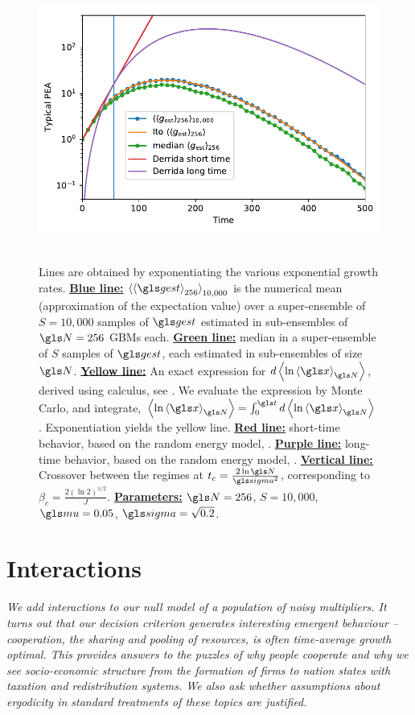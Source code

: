 \begin{figure}
\centering
\includegraphics[height=9.3cm]{./chapter_3/figs/PEA.pdf}
\caption{Lines are obtained by exponentiating the various exponential 
growth rates. {\bf \underline{Blue line:}} $\ave{\ave{\gest}_{256}}_{10,000}$ is the numerical mean 
(approximation of the expectation value) 
over a super-ensemble of $S=10,000$ samples of $\gest$ estimated in sub-ensembles of $\N=256$ GBMs each. 
{\bf \underline{Green line:}} median in a super-ensemble of $S$ samples of $\gest$, each estimated in sub-ensembles of size $\N$. 
{\bf \underline{Yellow line:}} An exact expression for $d\ave{\ln\ave{\x}_\N}$, derived using \Ito calculus, see \cite{PetersAdamou2018b}. We evaluate the expression by Monte Carlo, and integrate, $\ave{\ln\ave{\x}_\N}=\int_{0}^{\t} d\ave{\ln\ave{\x}_\N}$. Exponentiation yields the yellow line. 
{\bf \underline{Red line:}} short-time behavior, based on the random energy model, .
{\bf \underline{Purple line:}} long-time behavior, based on the random energy model, . {\bf \underline{Vertical line:}} Crossover between the regimes at $t_c=\frac{2\ln \N}{\gsigma^2}$, corresponding to $\beta_c=\frac{2(\ln 2)^{1/2}}{J}$.
{\bf \underline{Parameters:}} $\N=256$, $S=10,000$, $\gmu=0.05$, $\gsigma=\sqrt{0.2}$.}
\end{figure}
\FloatBarrier

\newpage


\section{Interactions}
{\it
We add interactions to our null model of a population of noisy multipliers. It turns out that our decision criterion generates interesting emergent behaviour -- cooperation, the sharing and pooling of resources, is often time-average 
growth optimal. This provides answers to the puzzles of why people cooperate and why we see socio-economic structure from the formation of firms to nation states with taxation and redistribution systems. We also ask whether assumptions about ergodicity in standard treatments of these topics are justified.}
\newpage


